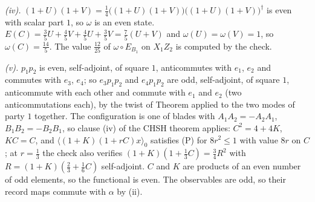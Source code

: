 \emph{(iv).} $(1 + U)(1 + V) = \tfrac14\bigl((1 + U)(1 + V)\bigr)\bigl((1 + U)(1 + V)\bigr)^{\dagger}$ is even with scalar part $1$, so $\omega$ is an even state. $E(C) = \tfrac35U + \tfrac45V + \tfrac45U + \tfrac35V = \tfrac75(U + V)$ and $\omega(U) = \omega(V) = 1$, so $\omega(C) = \tfrac{14}{5}$. The value $\tfrac{12}{25}$ of $\omega \circ E_{B_{1}}$ on $X_{1}Z_{2}$ is computed by the check.

\emph{(v).} $p_{1}p_{2}$ is even, self-adjoint, of square $1$, anticommutes with $e_{1}$, $e_{2}$ and commutes with $e_{3}$, $e_{4}$; so $e_{3}p_{1}p_{2}$ and $e_{4}p_{1}p_{2}$ are odd, self-adjoint, of square $1$, anticommute with each other and commute with $e_{1}$ and $e_{2}$ (two anticommutations each), by the twist of Theorem  applied to the two modes of party $1$ together. The configuration is one of blades with $A_{1}A_{2} = -A_{2}A_{1}$, $B_{1}B_{2} = -B_{2}B_{1}$, so clause (iv) of the CHSH theorem applies: $C^{2} = 4 + 4K$, $KC = C$, and $\langle(1 + K)(1 + rC)x\rangle_{0}$ satisfies (P) for $8r^{2} \le 1$ with value $8r$ on $C$; at $r = \tfrac13$ the check also verifies $(1 + K)(1 + \tfrac13C) = \tfrac34R^{2}$ with $R = (1 + K)(\tfrac23 + \tfrac16C)$ self-adjoint. $C$ and $K$ are products of an even number of odd elements, so the functional is even. The observables are odd, so their record maps commute with $\alpha$ by (ii).
